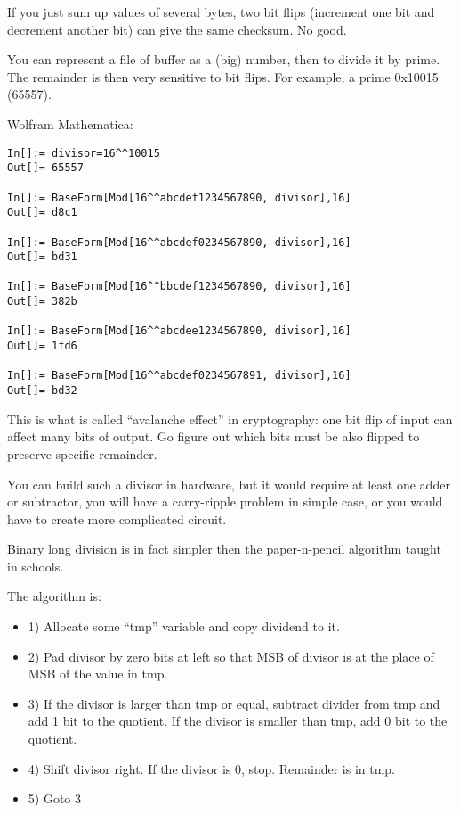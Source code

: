 
\renewcommand{\CURPATH}{GF2}

\leveldown{}


If you just sum up values of several bytes, two bit flips (increment one bit and decrement another bit) can
give the same checksum.
No good.


You can represent a file of buffer as a (big) number, then to divide it by prime.
The remainder is then very sensitive to bit flips.
For example, a prime 0x10015 (65557).

Wolfram Mathematica:

\begin{lstlisting}
In[]:= divisor=16^^10015
Out[]= 65557

In[]:= BaseForm[Mod[16^^abcdef1234567890, divisor],16]
Out[]= d8c1

In[]:= BaseForm[Mod[16^^abcdef0234567890, divisor],16]
Out[]= bd31

In[]:= BaseForm[Mod[16^^bbcdef1234567890, divisor],16]
Out[]= 382b

In[]:= BaseForm[Mod[16^^abcdee1234567890, divisor],16]
Out[]= 1fd6

In[]:= BaseForm[Mod[16^^abcdef0234567891, divisor],16]
Out[]= bd32
\end{lstlisting}

This is what is called ``avalanche effect'' in cryptography: one bit flip of input can affect many bits of output.
Go figure out which bits must be also flipped to preserve specific remainder.

You can build such a divisor in hardware, but it would require at least one adder or subtractor, you will have
a carry-ripple problem in simple case, or you would have to create more complicated circuit.


Binary long division is in fact simpler then the paper-n-pencil algorithm taught in schools.

The algorithm is:

\begin{itemize}

\item 1) Allocate some ``tmp'' variable and copy dividend to it.

\item 2) Pad divisor by zero bits at left so that \ac{MSB} of divisor is at the place of \ac{MSB} of the value in tmp.

\item 3) If the divisor is larger than tmp or equal, subtract divider from tmp and add 1 bit to the quotient.
If the divisor is smaller than tmp, add 0 bit to the quotient.

\item 4) Shift divisor right.
If the divisor is 0, stop. Remainder is in tmp.

\item 5) Goto 3

\end{itemize}

